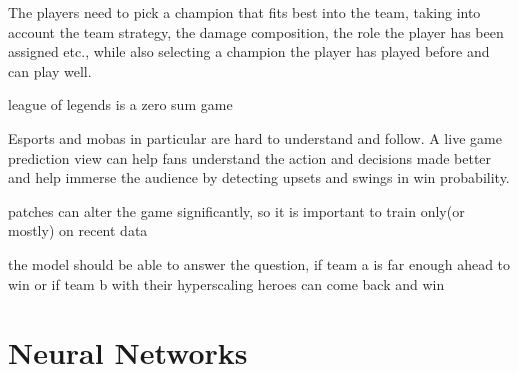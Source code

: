 \documentclass[12pt, a4paper, headinclude, twoside, plainheadsepline, open=right, numbers=noenddot, hidelinks, toc=listof, toc=bibliography]{scrreprt}
\begin{document}
The players need to pick a champion that fits best into the team, taking into account the team strategy, the damage composition, the role the player has been assigned etc., while also selecting a champion the player has played before and can play well.

league of legends is a zero sum game

Esports and mobas in particular are hard to understand and follow. A live game prediction view can help fans understand the action and decisions made better and help immerse the audience by detecting upsets and swings in win probability.

patches can alter the game significantly, so it is important to train only(or mostly) on recent data


the model should be able to answer the question, if team a is far enough ahead to win or if team b with their hyperscaling heroes can come back and win


\section{Neural Networks}
\label{sec:nn}
\end{document}
